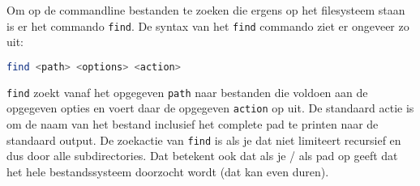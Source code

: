 Om op de commandline bestanden te zoeken die ergens op het filesysteem staan is er het commando \texttt{find}. De syntax van het \texttt{find} commando ziet er ongeveer zo uit:
\begin{lstlisting}[language=bash]
find <path> <options> <action>
\end{lstlisting}
\texttt{find} zoekt vanaf het opgegeven \texttt{path} naar bestanden die voldoen aan de opgegeven opties en voert daar de opgegeven \texttt{action} op uit. De standaard actie is om de naam van het bestand inclusief het complete pad te printen naar de standaard output. De zoekactie van \texttt{find} is als je dat niet limiteert recursief en dus door alle subdirectories. Dat betekent ook dat als je / als pad op geeft dat het hele bestandssysteem doorzocht wordt (dat kan even duren).
